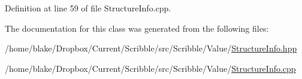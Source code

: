 Definition at line 59 of file Structure\-Info.\-cpp.



The documentation for this class was generated from the following files\-:\begin{DoxyCompactItemize}
\item 
/home/blake/\-Dropbox/\-Current/\-Scribble/src/\-Scribble/\-Value/\hyperlink{_structure_info_8hpp}{Structure\-Info.\-hpp}\item 
/home/blake/\-Dropbox/\-Current/\-Scribble/src/\-Scribble/\-Value/\hyperlink{_structure_info_8cpp}{Structure\-Info.\-cpp}\end{DoxyCompactItemize}
